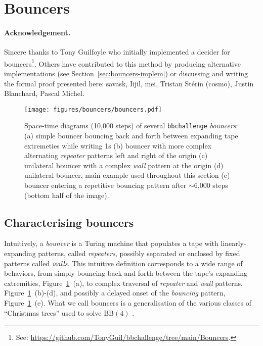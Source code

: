 \newpage
\section{Bouncers}\label{sec:bouncers}

\paragraph{Acknowledgement.}  Sincere thanks to Tony Guilfoyle who initially implemented a decider for bouncers\footnote{See: \url{https://github.com/TonyGuil/bbchallenge/tree/main/Bouncers}.}.
Others have contributed to this method by producing alternative implementations (see Section~\ref{sec:bouncers-implem}) or discussing and writing the formal proof presented here: savask, Iijil, mei, Tristan Stérin (cosmo), Justin Blanchard, Pascal Michel.


\begin{figure}[h!]
    \centering
    \texttt{[image: figures/bouncers/bouncers.pdf]}
    \caption{Space-time diagrams (10,000 steps) of several \texttt{bbchallenge} \textit{bouncers}: (a) simple bouncer bouncing back and forth between expanding tape extremeties while writing 1s (b) bouncer with more complex alternating \textit{repeater} patterns left and right of the origin (c) unilateral bouncer with a complex \textit{wall} pattern at the origin (d) unilateral bouncer, main example used throughout this section (e) bouncer entering a repetitive bouncing pattern after $\sim$6,000 steps (bottom half of the image).}\label{fig:bouncers}
\end{figure}

\subsection{Characterising bouncers}

Intuitively, a \emph{bouncer} is a Turing machine that populates a tape with
linearly-expanding patterns, called \textit{repeaters}, possibly separated or enclosed by fixed patterns called \textit{walls}. This intuitive definition corresponds to a wide range of behaviors, from simply bouncing back and forth between the tape's expanding extremities, Figure~\ref{fig:bouncers}~(a), to complex traversal of \textit{repeater} and \textit{wall} patterns, Figure~\ref{fig:bouncers}~(b)-(d), and possibly a delayed onset of the \textit{bouncing} pattern, Figure~\ref{fig:bouncers}~(e). What we call bouncers is a generalisation of the various classes of ``Christmas trees'' used to solve $\text{BB}(4)$ \cite{Brady83}.

